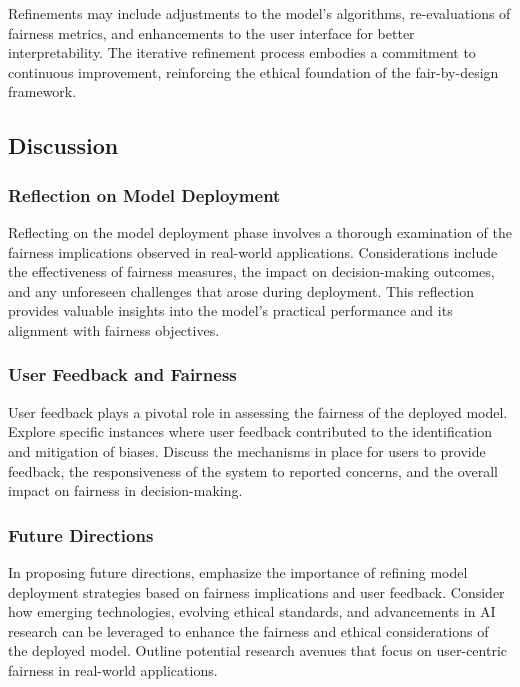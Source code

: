 \documentclass[12pt,a4paper,openright,twoside]{book}
\begin{document}
Refinements may include adjustments to the model's algorithms, re-evaluations of fairness metrics, and enhancements to the user interface for better interpretability. The iterative refinement process embodies a commitment to continuous improvement, reinforcing the ethical foundation of the fair-by-design framework.

\subsection{Discussion}

\subsubsection{Reflection on Model Deployment}

Reflecting on the model deployment phase involves a thorough examination of the fairness implications observed in real-world applications. Considerations include the effectiveness of fairness measures, the impact on decision-making outcomes, and any unforeseen challenges that arose during deployment. This reflection provides valuable insights into the model's practical performance and its alignment with fairness objectives.

\subsubsection{User Feedback and Fairness}

User feedback plays a pivotal role in assessing the fairness of the deployed model. Explore specific instances where user feedback contributed to the identification and mitigation of biases. Discuss the mechanisms in place for users to provide feedback, the responsiveness of the system to reported concerns, and the overall impact on fairness in decision-making.

\subsubsection{Future Directions}

In proposing future directions, emphasize the importance of refining model deployment strategies based on fairness implications and user feedback. Consider how emerging technologies, evolving ethical standards, and advancements in AI research can be leveraged to enhance the fairness and ethical considerations of the deployed model. Outline potential research avenues that focus on user-centric fairness in real-world applications.
\end{document}
